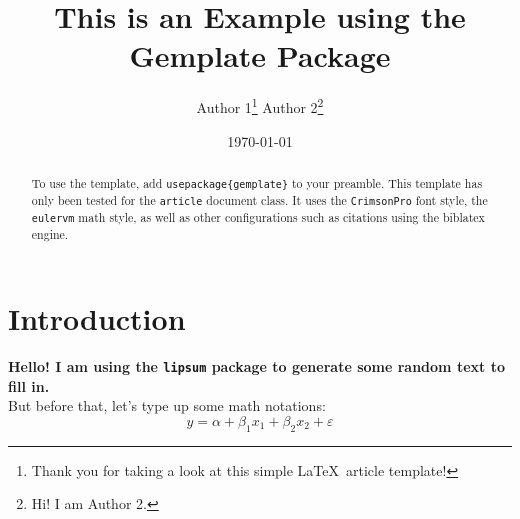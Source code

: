 \documentclass[12pt]{article}
\title{\textbf{This is an Example using the Gemplate Package}}
\author{Author 1\thanks{\protect\linespread{1}\protect\selectfont Thank you for taking a look at this simple \LaTeX \ article template!} \hspace{15ex}
Author 2\thanks{\protect\linespread{1}\protect\selectfont Hi! I am Author 2.}}
\date{\today}
\begin{document}
\maketitle

\begin{abstract}
    To use the template, add \texttt{usepackage\{gemplate\}} to your preamble. This template has only been tested for the \texttt{article} document class. It uses the \texttt{CrimsonPro} font style, the \texttt{eulervm} math style, as well as other configurations such as citations using the biblatex engine.
\end{abstract}

\newpage

\section{Introduction}
\textbf{Hello! I am using the \texttt{lipsum} package to generate some random text to fill in.} ~\\

But before that, let's type up some math notations:
$$
    y = \alpha + \beta_1x_1 + \beta_2x_2 + \varepsilon
$$

\lipsum[2-3]
\end{document}
